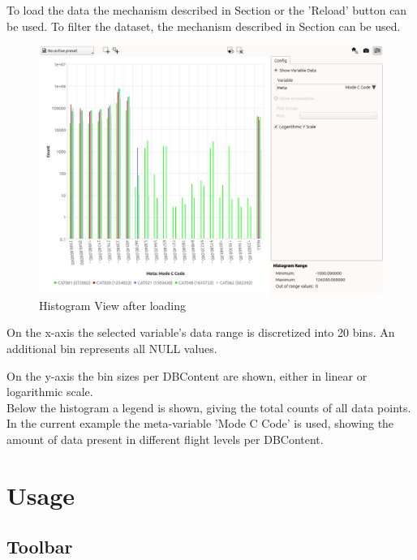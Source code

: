 To load the data the mechanism described in Section  or the 'Reload' button can be used. To filter the dataset, the mechanism described in Section  can be used. \\

\begin{figure}[H]
    \hspace*{-2cm}
    \includegraphics[width=18cm,frame]{figures/histogram_loaded.png}
  \caption{Histogram View after loading}
\end{figure}

On the x-axis the selected variable's data range is discretized into 20 bins. An additional bin represents all NULL values.

On the y-axis the bin sizes per DBContent are shown, either in linear or logarithmic scale. \\

Below the histogram a legend is shown, giving the total counts of all data points. \\

In the current example the meta-variable 'Mode C Code' is used, showing the amount of data present in different flight levels per DBContent.

\section{Usage}

\subsection{Toolbar}

